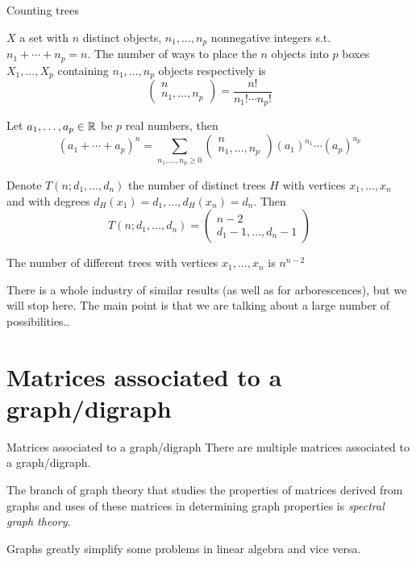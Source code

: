 \documentclass[aspectratio=169]{beamer}
\begin{document}
\begin{frame}{Counting trees}
\begin{proposition}
$X$ a set with $n$ distinct objects, $n_1,\ldots,n_p$ nonnegative integers s.t. $n_1+\cdots+n_p=n$. The number of ways to place the $n$ objects into $p$ boxes $X_1,\ldots,X_p$ containing $n_1,\ldots,n_p$ objects respectively is 
\[
	\begin{pmatrix}
		n\\ n_1,\ldots,n_p
	\end{pmatrix}
	=
	\frac{n!}{n_1!\cdots n_p!}
\]
\end{proposition}
\vfill
\begin{proposition}
Let $a_1,\ldots,a_p\in\mathbb{R}$ be $p$ real numbers, then
\[
	(a_1+\cdots+a_p)^n= 
	\sum_{n_1,\ldots,n_p\geq 0}
	\begin{pmatrix}
		n\\ n_1,\ldots,n_p
	\end{pmatrix}
	(a_1)^{n_1}\cdots(a_p)^{n_p}	
\]
\end{proposition}
\end{frame}


\begin{frame}
\begin{theorem}
Denote $T(n;d_1,\ldots,d_n)$ the number of distinct trees $H$ with vertices $x_1,\ldots,x_n$ and with degrees $d_H(x_1)=d_1,\ldots,d_H(x_n)=d_n$. Then
\[
	T(n;d_1,\ldots,d_n) = 
	\begin{pmatrix}
		n-2 \\
		d_1-1,\ldots,d_n-1
	\end{pmatrix}
\]
\end{theorem}
\vfill
\begin{theorem}
The number of different trees with vertices $x_1,\ldots,x_n$ is 
$n^{n-2}$
\end{theorem}
\vfill
There is a whole industry of similar results (as well as for arborescences), but we will stop here. The main point is that we are talking about a large number of possibilities..
\end{frame}


\section{Matrices associated to a graph/digraph}

\begin{frame}{Matrices associated to a graph/digraph}
	There are multiple matrices associated to a graph/digraph.

	The branch of graph theory that studies the properties of matrices derived from graphs and uses of these matrices in determining graph properties is \emph{spectral graph theory}.
	
	Graphs greatly simplify some problems in linear algebra and vice versa.
\end{frame}
\end{document}
